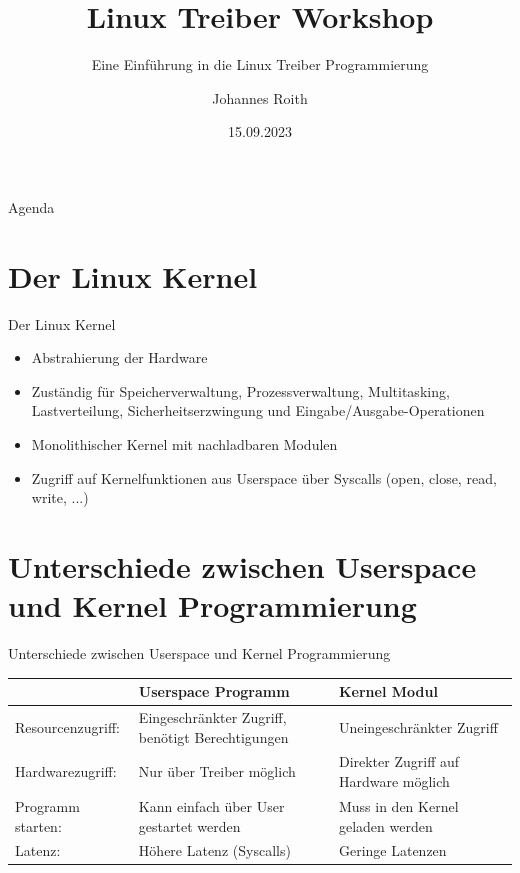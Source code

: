 \documentclass[aspectratio=169]{beamer}
\title{Linux Treiber Workshop}
\subtitle{Eine Einführung in die Linux Treiber Programmierung}
\author{Johannes Roith}
\date{15.09.2023}
\begin{document}
\begin{frame}
  \titlepage
\end{frame}

\begin{frame}{Agenda}
  \tableofcontents
\end{frame}

\section{Der Linux Kernel}
\begin{frame}{Der Linux Kernel}
	\begin{itemize}
		\item Abstrahierung der Hardware
		\item Zuständig für Speicherverwaltung, Prozessverwaltung, Multitasking, Lastverteilung, Sicherheitserzwingung und Eingabe/Ausgabe-Operationen
		\item Monolithischer Kernel mit nachladbaren Modulen
		\item Zugriff auf Kernelfunktionen aus Userspace über Syscalls (open, close, read, write, ...)
	\end{itemize}
\end{frame}


\section{Unterschiede zwischen Userspace und Kernel Programmierung}
\begin{frame}{Unterschiede zwischen Userspace und Kernel Programmierung}
	\centering
	\begin{tabular}{p{}|p{}|p{}}
		& \bfseries Userspace Programm & \bfseries Kernel Modul \\
		\hline
		Resourcenzugriff: & Eingeschränkter Zugriff, benötigt Berechtigungen & Uneingeschränkter Zugriff \\
		Hardwarezugriff: & Nur über Treiber möglich & Direkter Zugriff auf Hardware möglich \\
		Programm starten: & Kann einfach über User gestartet werden & Muss in den Kernel geladen werden \\
		Latenz: & Höhere Latenz (Syscalls) & Geringe Latenzen\\
	\end{tabular}
\end{frame}
\end{document}
